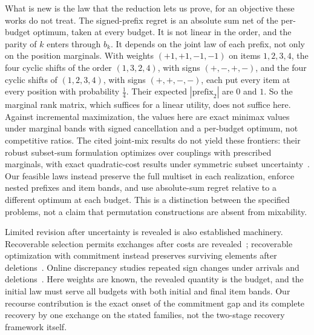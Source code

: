 \documentclass[conference]{IEEEtran}
\theoremstyle{definition}
\begin{document}
What is new is the law that the reduction lets us prove, for an objective these works do not
treat. The signed-prefix regret is an absolute sum net of the per-budget optimum, taken at
every budget. It is not linear in the order, and the parity of $k$ enters through $b_{k}$. It
depends on the joint law of each prefix, not only on the position marginals. With weights
$(+1,+1,-1,-1)$ on items $1,2,3,4$, the four cyclic shifts of the order $(1,3,2,4)$, with signs
$(+,-,+,-)$, and the four cyclic shifts of $(1,2,3,4)$, with signs $(+,+,-,-)$, each put every item
at every position with probability $\frac14$. Their expected $|\text{prefix}_{2}|$ are $0$ and
$1$. So the marginal rank matrix, which suffices for a linear utility, does not
suffice here. Against incremental maximization, the values here are exact minimax values under
marginal bands with signed cancellation and a per-budget optimum, not competitive ratios. The
cited joint-mix results do not yield these frontiers: their robust subset-sum formulation
optimizes over couplings with prescribed marginals, with exact quadratic-cost results under
symmetric subset uncertainty~\cite{koike2022}. Our feasible laws instead preserve the full
multiset in each realization, enforce nested prefixes and item bands, and use absolute-sum
regret relative to a different optimum at each budget. This is a distinction between the
specified problems, not a claim that permutation constructions are absent from mixability.

Limited revision after uncertainty is revealed is also established machinery. Recoverable
selection permits exchanges after costs are revealed~\cite{chassein2017}; recoverable
optimization with commitment instead preserves surviving elements after deletions~\cite{hommelsheim2026}.
Online discrepancy studies repeated sign changes under arrivals and deletions~\cite{gupta2022}.
Here weights are known, the revealed quantity is the budget, and the initial law must serve
all budgets with both initial and final item bands. Our recourse contribution is the exact
onset of the commitment gap and its complete recovery by one exchange on the stated families,
not the two-stage recovery framework itself.
\end{document}
